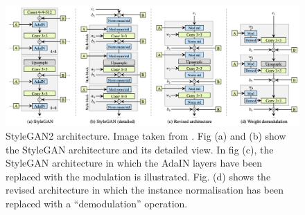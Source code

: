  \begin{figure}[htbp]
\centering
  \includegraphics[scale=0.4]{figures/StyleGAN2-architecture.png}
  \caption{StyleGAN2 architecture. Image taken from \cite{Karras2019stylegan2}. Fig (a) and (b) show the StyleGAN architecture and its detailed view. In fig (c), the StyleGAN architecture in which the AdaIN layers have been replaced with the modulation is illustrated. Fig. (d) shows the revised architecture in which the instance normalisation has been replaced with a “demodulation” operation.}
  \label{fig:StyleGAN2 architecture}
\end{figure}


